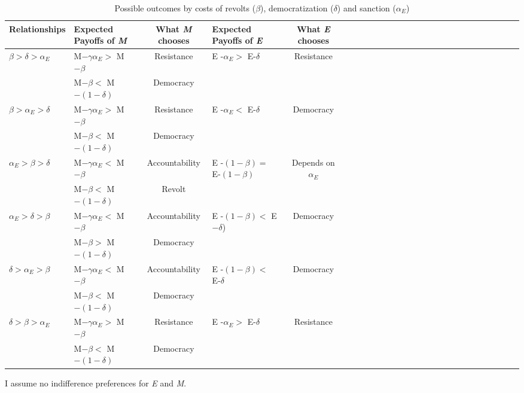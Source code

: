 \documentclass[11pt, letterpage]{article}
\begin{document}
\begin{table}[!ht]
	\centering
	\caption{Possible outcomes by costs of revolts ($\beta$), democratization ($\delta$) and sanction ($\alpha_{E}$)}
	\begin{tabular}{l*{5}{l c l c l}}
		\toprule
		\multicolumn{1}{c}{Relationships} &\multicolumn{1}{l}{Expected Payoffs of \textit{M}} &\multicolumn{1}{c}{What \textit{M} chooses}		&\multicolumn{1}{l}{Expected Payoffs of \textit{E}} &\multicolumn{1}{c}{What \textit{E} chooses} \\
		\midrule
		$\beta > \delta > \alpha_{E}$	& M$-\gamma\alpha_{E} > $ M$-\beta$        & Resistance & E -$\alpha_{E} >$ E-$\delta$  & Resistance\\
		                                & M$-\beta 			  < $ M $-(1-\delta)$  & Democracy	&  							      &           \\
		$\beta > \alpha_{E} > \delta$	& M$-\gamma\alpha_{E} > $ M$-\beta$        & Resistance & E -$\alpha_{E} <$ E-$\delta$ & Democracy \\
		                                & M$-\beta 			  < $ M $-(1-\delta)$  & Democracy	&  						  		  &           \\
		$\alpha_{E} > \beta > \delta$	& M$-\gamma\alpha_{E} < $ M$-\beta$        & Accountability & E -$(1-\beta) =$ E-$(1-\beta)$ & Depends on $\alpha_{E}$    \\
		                                & M$-\beta            < $ M $-(1-\delta)$  & Revolt	&  							      &           \\
		$\alpha_{E} > \delta > \beta$	& M$-\gamma\alpha_{E} < $ M$-\beta$        & Accountability & E -$(1-\beta) <$ E$-\delta$) & Democracy \\
		                                & M$-\beta            > $ M $-(1-\delta)$  & Democracy 		&  							      &           \\
		$\delta > \alpha_{E} > \beta$   & M$-\gamma\alpha_{E} < $ M$-\beta$        & Accountability & E -$(1-\beta) <$ E-$\delta$ & Democracy \\
		                                & M$-\beta            < $ M $-(1-\delta)$  & Democracy	&  							      &			  \\
		$\delta > \beta > \alpha_{E}$	& M$-\gamma\alpha_{E} > $ M$-\beta$        & Resistance & E -$\alpha_{E} >$ E-$\delta$    & Resistance \\
		                                & M$-\beta            < $ M $-(1-\delta)$  & Democracy  &  							      &			  \\
		\bottomrule
	\end{tabular}
	\vspace{0.5cm}
	{\raggedright I assume no indifference preferences for \textit{E} and \textit{M}. \par}
	\label{tab:table1}
\end{table}
\end{document}
